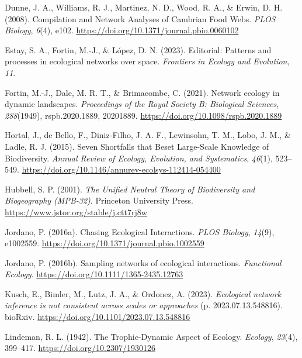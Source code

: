 \documentclass[
]{article}
\newlength{\cslhangindent}
\newenvironment{CSLReferences}[2] %
 {\begin{list}{}{%
  \setlength{\itemindent}{0pt}
  \setlength{\leftmargin}{0pt}
  \setlength{\parsep}{0pt}
  \ifodd #1
   \setlength{\leftmargin}{\cslhangindent}
   \setlength{\itemindent}{-1\cslhangindent}
  \fi
  \setlength{\itemsep}{#2\baselineskip}}}
 {\end{list}}
\begin{document}
\begin{CSLReferences}{1}{0}
Dunne, J. A., Williams, R. J., Martinez, N. D., Wood, R. A., \& Erwin,
D. H. (2008). Compilation and {Network Analyses} of {Cambrian Food
Webs}. \emph{PLOS Biology}, \emph{6}(4), e102.
\url{https://doi.org/10.1371/journal.pbio.0060102}

Estay, S. A., Fortin, M.-J., \& López, D. N. (2023). Editorial:
{Patterns} and processes in ecological networks over space.
\emph{Frontiers in Ecology and Evolution}, \emph{11}.

Fortin, M.-J., Dale, M. R. T., \& Brimacombe, C. (2021). Network ecology
in dynamic landscapes. \emph{Proceedings of the Royal Society B:
Biological Sciences}, \emph{288}(1949), rspb.2020.1889, 20201889.
\url{https://doi.org/10.1098/rspb.2020.1889}

Hortal, J., de Bello, F., Diniz-Filho, J. A. F., Lewinsohn, T. M., Lobo,
J. M., \& Ladle, R. J. (2015). Seven {Shortfalls} that {Beset
Large-Scale Knowledge} of {Biodiversity}. \emph{Annual Review of
Ecology, Evolution, and Systematics}, \emph{46}(1), 523--549.
\url{https://doi.org/10.1146/annurev-ecolsys-112414-054400}

Hubbell, S. P. (2001). \emph{The {Unified Neutral Theory} of
{Biodiversity} and {Biogeography} ({MPB-32})}. Princeton University
Press. \url{https://www.jstor.org/stable/j.ctt7rj8w}

Jordano, P. (2016a). Chasing {Ecological Interactions}. \emph{PLOS
Biology}, \emph{14}(9), e1002559.
\url{https://doi.org/10.1371/journal.pbio.1002559}

Jordano, P. (2016b). Sampling networks of ecological interactions.
\emph{Functional Ecology}. \url{https://doi.org/10.1111/1365-2435.12763}

Kusch, E., Bimler, M., Lutz, J. A., \& Ordonez, A. (2023).
\emph{Ecological network inference is not consistent across scales or
approaches} (p. 2023.07.13.548816). bioRxiv.
\url{https://doi.org/10.1101/2023.07.13.548816}

Lindeman, R. L. (1942). The {Trophic-Dynamic Aspect} of {Ecology}.
\emph{Ecology}, \emph{23}(4), 399--417.
\url{https://doi.org/10.2307/1930126}


\end{CSLReferences}
\end{document}
